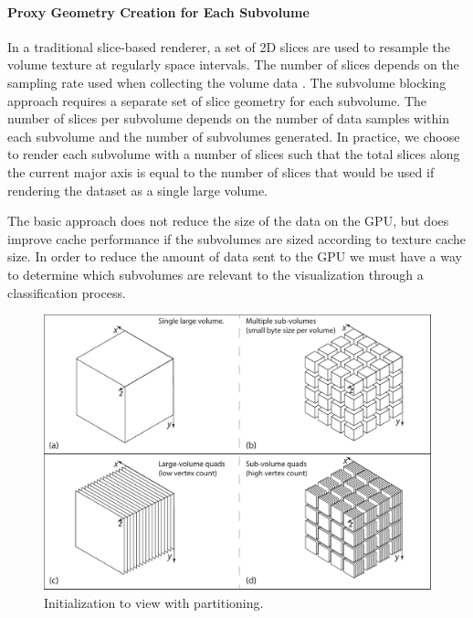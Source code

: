 \documentclass[journal]{vgtc}                %
\begin{document}
\paragraph{Proxy Geometry Creation for Each Subvolume}
In a traditional slice-based renderer, a set of 2D slices are used to resample the volume
texture at regularly space intervals. The number of slices depends on the sampling
rate used when collecting the volume data \cite{Engel2004}. The subvolume blocking approach 
requires a separate set of slice geometry for each 
subvolume. The number of slices per subvolume depends on the number of 
data samples within each subvolume and the number of subvolumes generated. In practice,
we choose to render each subvolume with a number of slices such that the total slices along
the current major axis is equal to the number of slices that would be used if rendering the 
dataset as a single large volume.

The basic approach does not reduce the size of the data on the GPU, but does
improve cache performance if the subvolumes are sized according to texture
cache size. In order to reduce the amount of data sent to the GPU we must have 
a way to determine which subvolumes are relevant to the visualization through
a classification process.

\begin{figure}[htb]\label{fig:volumeToSubvolumes}
	\begin{centering}
		\includegraphics[width=\linewidth,height=0.3\textheight,keepaspectratio]{volume_to_subvolumes_and_quads}
		\caption{Initialization to view with partitioning.}
	\end{centering}
\end{figure}
\end{document}
